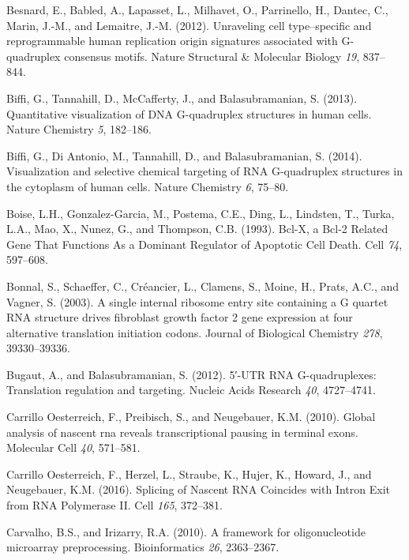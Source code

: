 \documentclass[12pt,a4paper,]{report}
\begin{document}
\leavevmode\hypertarget{ref-Besnard2012}{}%
Besnard, E., Babled, A., Lapasset, L., Milhavet, O., Parrinello, H.,
Dantec, C., Marin, J.-M., and Lemaitre, J.-M. (2012). Unraveling cell
type--specific and reprogrammable human replication origin signatures
associated with G-quadruplex consensus motifs. Nature Structural \&
Molecular Biology \emph{19}, 837--844.

\leavevmode\hypertarget{ref-Biffi2013}{}%
Biffi, G., Tannahill, D., McCafferty, J., and Balasubramanian, S.
(2013). Quantitative visualization of DNA G-quadruplex structures in
human cells. Nature Chemistry \emph{5}, 182--186.

\leavevmode\hypertarget{ref-Biffi2014}{}%
Biffi, G., Di Antonio, M., Tannahill, D., and Balasubramanian, S.
(2014). Visualization and selective chemical targeting of RNA
G-quadruplex structures in the cytoplasm of human cells. Nature
Chemistry \emph{6}, 75--80.

\leavevmode\hypertarget{ref-Boise1993}{}%
Boise, L.H., Gonzalez-Garcia, M., Postema, C.E., Ding, L., Lindsten, T.,
Turka, L.A., Mao, X., Nunez, G., and Thompson, C.B. (1993). Bcl-X, a
Bcl-2 Related Gene That Functions As a Dominant Regulator of Apoptotic
Cell Death. Cell \emph{74}, 597--608.

\leavevmode\hypertarget{ref-Bonnal2003}{}%
Bonnal, S., Schaeffer, C., Créancier, L., Clamens, S., Moine, H., Prats,
A.C., and Vagner, S. (2003). A single internal ribosome entry site
containing a G quartet RNA structure drives fibroblast growth factor 2
gene expression at four alternative translation initiation codons.
Journal of Biological Chemistry \emph{278}, 39330--39336.

\leavevmode\hypertarget{ref-Bugaut2012}{}%
Bugaut, A., and Balasubramanian, S. (2012). 5′-UTR RNA G-quadruplexes:
Translation regulation and targeting. Nucleic Acids Research \emph{40},
4727--4741.

\leavevmode\hypertarget{ref-CarrilloOesterreich2010}{}%
Carrillo Oesterreich, F., Preibisch, S., and Neugebauer, K.M. (2010).
Global analysis of nascent rna reveals transcriptional pausing in
terminal exons. Molecular Cell \emph{40}, 571--581.

\leavevmode\hypertarget{ref-CarrilloOesterreich2016}{}%
Carrillo Oesterreich, F., Herzel, L., Straube, K., Hujer, K., Howard,
J., and Neugebauer, K.M. (2016). Splicing of Nascent RNA Coincides with
Intron Exit from RNA Polymerase II. Cell \emph{165}, 372--381.

\leavevmode\hypertarget{ref-Carvalho2010}{}%
Carvalho, B.S., and Irizarry, R.A. (2010). A framework for
oligonucleotide microarray preprocessing. Bioinformatics \emph{26},
2363--2367.
\end{document}
